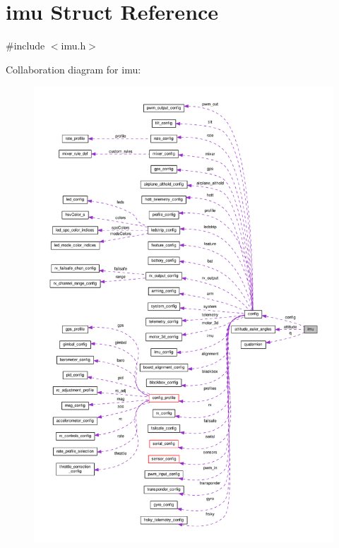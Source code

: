 \hypertarget{structimu}{\section{imu Struct Reference}
\label{structimu}
}


{\ttfamily \#include $<$imu.\+h$>$}



Collaboration diagram for imu\+:\nopagebreak
\begin{figure}[H]
\begin{center}
\leavevmode
\includegraphics[width=350pt]{structimu__coll__graph}
\end{center}
\end{figure}
